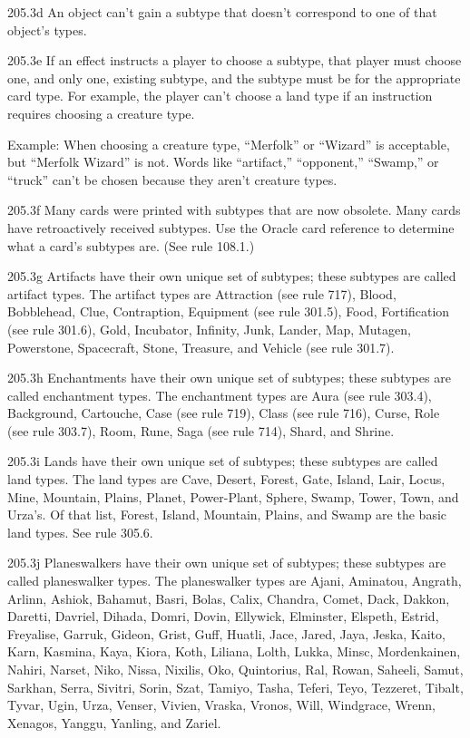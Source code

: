 205.3d An object can’t gain a subtype that doesn’t correspond to one of that object’s types.

205.3e If an effect instructs a player to choose a subtype, that player must choose one, and only one, existing subtype, and the subtype must be for the appropriate card type. For example, the player can’t choose a land type if an instruction requires choosing a creature type.

Example: When choosing a creature type, “Merfolk” or “Wizard” is acceptable, but “Merfolk Wizard” is not. Words like “artifact,” “opponent,” “Swamp,” or “truck” can’t be chosen because they aren’t creature types.

205.3f Many cards were printed with subtypes that are now obsolete. Many cards have retroactively received subtypes. Use the Oracle card reference to determine what a card’s subtypes are. (See rule 108.1.)

205.3g Artifacts have their own unique set of subtypes; these subtypes are called artifact types. The artifact types are Attraction (see rule 717), Blood, Bobblehead, Clue, Contraption, Equipment (see rule 301.5), Food, Fortification (see rule 301.6), Gold, Incubator, Infinity, Junk, Lander, Map, Mutagen, Powerstone, Spacecraft, Stone, Treasure, and Vehicle (see rule 301.7).

205.3h Enchantments have their own unique set of subtypes; these subtypes are called enchantment types. The enchantment types are Aura (see rule 303.4), Background, Cartouche, Case (see rule 719), Class (see rule 716), Curse, Role (see rule 303.7), Room, Rune, Saga (see rule 714), Shard, and Shrine.

205.3i Lands have their own unique set of subtypes; these subtypes are called land types. The land types are Cave, Desert, Forest, Gate, Island, Lair, Locus, Mine, Mountain, Plains, Planet, Power-Plant, Sphere, Swamp, Tower, Town, and Urza’s. Of that list, Forest, Island, Mountain, Plains, and Swamp are the basic land types. See rule 305.6.

205.3j Planeswalkers have their own unique set of subtypes; these subtypes are called planeswalker types. The planeswalker types are Ajani, Aminatou, Angrath, Arlinn, Ashiok, Bahamut, Basri, Bolas, Calix, Chandra, Comet, Dack, Dakkon, Daretti, Davriel, Dihada, Domri, Dovin, Ellywick, Elminster, Elspeth, Estrid, Freyalise, Garruk, Gideon, Grist, Guff, Huatli, Jace, Jared, Jaya, Jeska, Kaito, Karn, Kasmina, Kaya, Kiora, Koth, Liliana, Lolth, Lukka, Minsc, Mordenkainen, Nahiri, Narset, Niko, Nissa, Nixilis, Oko, Quintorius, Ral, Rowan, Saheeli, Samut, Sarkhan, Serra, Sivitri, Sorin, Szat, Tamiyo, Tasha, Teferi, Teyo, Tezzeret, Tibalt, Tyvar, Ugin, Urza, Venser, Vivien, Vraska, Vronos, Will, Windgrace, Wrenn, Xenagos, Yanggu, Yanling, and Zariel.

